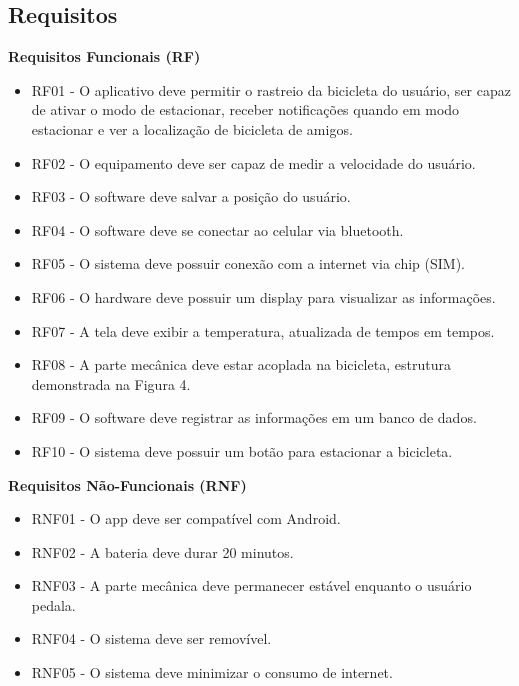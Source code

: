 \subsection{Requisitos}

\textbf {Requisitos Funcionais (RF)}
\begin{itemize}
  \item RF01 - O aplicativo deve permitir o rastreio da bicicleta do usuário, ser capaz de ativar o modo de estacionar, receber notificações quando em modo estacionar e ver a localização de bicicleta de amigos.
  \item RF02 - O equipamento deve ser capaz de medir a velocidade do usuário.
  \item RF03 - O software deve salvar a posição do usuário.
  \item RF04 - O software deve se conectar ao celular via bluetooth.
  \item RF05 - O sistema deve possuir conexão com a internet via chip (SIM).
  \item RF06 - O hardware deve possuir um display para visualizar as informações.
  \item RF07 - A tela deve exibir a temperatura, atualizada de tempos em tempos.
  \item RF08 - A parte mecânica deve estar acoplada na bicicleta, estrutura demonstrada na Figura 4.
  \item RF09 - O software deve registrar as informações em um banco de dados.
  \item RF10 - O sistema deve possuir um botão para estacionar a bicicleta.
\end{itemize}
\newpage
\textbf {Requisitos Não-Funcionais (RNF)}
\begin{itemize}
  \item RNF01 - O app deve ser compatível com Android.
  \item RNF02 - A bateria deve durar 20 minutos.
  \item RNF03 - A parte mecânica deve permanecer estável enquanto o usuário pedala.
  \item RNF04 - O sistema deve ser removível.
  \item RNF05 - O sistema deve minimizar o consumo de internet.
\end{itemize}
